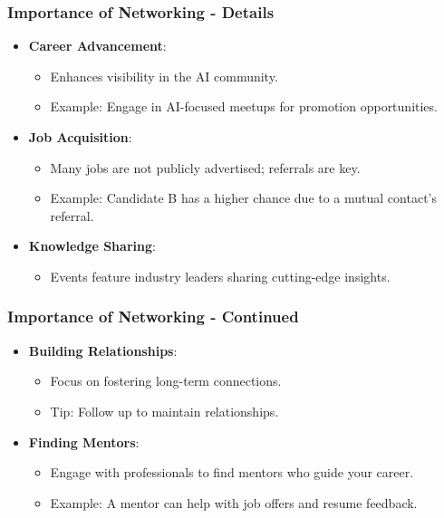 \documentclass{beamer}
\begin{document}
\begin{frame}[fragile]
    \frametitle{Importance of Networking - Details}
    \begin{itemize}
        \item \textbf{Career Advancement}:
            \begin{itemize}
                \item Enhances visibility in the AI community.
                \item Example: Engage in AI-focused meetups for promotion opportunities.
            \end{itemize}
        \item \textbf{Job Acquisition}:
            \begin{itemize}
                \item Many jobs are not publicly advertised; referrals are key.
                \item Example: Candidate B has a higher chance due to a mutual contact's referral.
            \end{itemize}
        \item \textbf{Knowledge Sharing}:
            \begin{itemize}
                \item Events feature industry leaders sharing cutting-edge insights.
            \end{itemize}
    \end{itemize}
\end{frame}

\begin{frame}[fragile]
    \frametitle{Importance of Networking - Continued}
    \begin{itemize}
        \item \textbf{Building Relationships}:
            \begin{itemize}
                \item Focus on fostering long-term connections.
                \item Tip: Follow up to maintain relationships.
            \end{itemize}
        \item \textbf{Finding Mentors}:
            \begin{itemize}
                \item Engage with professionals to find mentors who guide your career.
                \item Example: A mentor can help with job offers and resume feedback.
            \end{itemize}
    \end{itemize}
\end{frame}
\end{document}
